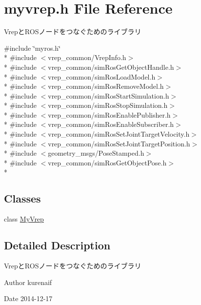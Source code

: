 \section{myvrep.\-h File Reference}
\label{myvrep_8h}


Vrepと\-R\-O\-Sノードをつなぐためのライブラリ  


{\ttfamily \#include \char`\"{}myros.\-h\char`\"{}}\\*
{\ttfamily \#include $<$vrep\-\_\-common/\-Vrep\-Info.\-h$>$}\\*
{\ttfamily \#include $<$vrep\-\_\-common/sim\-Ros\-Get\-Object\-Handle.\-h$>$}\\*
{\ttfamily \#include $<$vrep\-\_\-common/sim\-Ros\-Load\-Model.\-h$>$}\\*
{\ttfamily \#include $<$vrep\-\_\-common/sim\-Ros\-Remove\-Model.\-h$>$}\\*
{\ttfamily \#include $<$vrep\-\_\-common/sim\-Ros\-Start\-Simulation.\-h$>$}\\*
{\ttfamily \#include $<$vrep\-\_\-common/sim\-Ros\-Stop\-Simulation.\-h$>$}\\*
{\ttfamily \#include $<$vrep\-\_\-common/sim\-Ros\-Enable\-Publisher.\-h$>$}\\*
{\ttfamily \#include $<$vrep\-\_\-common/sim\-Ros\-Enable\-Subscriber.\-h$>$}\\*
{\ttfamily \#include $<$vrep\-\_\-common/sim\-Ros\-Set\-Joint\-Target\-Velocity.\-h$>$}\\*
{\ttfamily \#include $<$vrep\-\_\-common/sim\-Ros\-Set\-Joint\-Target\-Position.\-h$>$}\\*
{\ttfamily \#include $<$geometry\-\_\-msgs/\-Pose\-Stamped.\-h$>$}\\*
{\ttfamily \#include $<$vrep\-\_\-common/sim\-Ros\-Get\-Object\-Pose.\-h$>$}\\*
\subsection*{Classes}
\begin{DoxyCompactItemize}
\item 
class \hyperlink{classMyVrep}{My\-Vrep}
\end{DoxyCompactItemize}


\subsection{Detailed Description}
Vrepと\-R\-O\-Sノードをつなぐためのライブラリ \begin{DoxyAuthor}{Author}
kurenaif 
\end{DoxyAuthor}
\begin{DoxyDate}{Date}
2014-\/12-\/17 
\end{DoxyDate}
